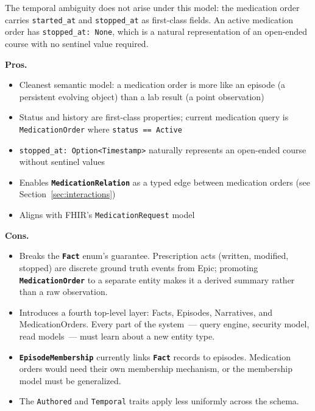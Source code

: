 \documentclass[11pt]{article}
\newcommand{\entity}[1]{\texttt{\textbf{#1}}}
\newcommand{\field}[1]{\texttt{#1}}
\newenvironment{prosbox}{%
  \begin{mdframed}[backgroundcolor=notegreen,
    linecolor=noteborder, linewidth=1pt,
    innertopmargin=8pt, innerbottommargin=8pt,
    innerleftmargin=10pt, innerrightmargin=10pt]
  \small
}{%
  \end{mdframed}
}
\newenvironment{consbox}{%
  \begin{mdframed}[backgroundcolor=warningyellow,
    linecolor=warningborder, linewidth=1pt,
    innertopmargin=8pt, innerbottommargin=8pt,
    innerleftmargin=10pt, innerrightmargin=10pt]
  \small
}{%
  \end{mdframed}
}
\begin{document}
The temporal ambiguity does not arise under this model: the medication
order carries \field{started\_at} and \field{stopped\_at} as
first-class fields. An active medication order has
\field{stopped\_at: None}, which is a natural representation of an
open-ended course with no sentinel value required.

\begin{prosbox}
\textbf{Pros.}
\begin{itemize}[noitemsep]
  \item Cleanest semantic model: a medication order is more like an
    episode (a persistent evolving object) than a lab result (a point
    observation)
  \item Status and history are first-class properties; current
    medication query is \field{MedicationOrder} where
    \field{status == Active}
  \item \field{stopped\_at: Option<Timestamp>} naturally represents
    an open-ended course without sentinel values
  \item Enables \entity{MedicationRelation} as a typed edge between
    medication orders (see Section~\ref{sec:interactions})
  \item Aligns with FHIR's \texttt{MedicationRequest} model
\end{itemize}
\end{prosbox}

\begin{consbox}
\textbf{Cons.}
\begin{itemize}[noitemsep]
  \item Breaks the \entity{Fact} enum's guarantee. Prescription acts
    (written, modified, stopped) are discrete ground truth events from
    Epic; promoting \entity{MedicationOrder} to a separate entity
    makes it a derived summary rather than a raw observation.
  \item Introduces a fourth top-level layer: Facts, Episodes,
    Narratives, and MedicationOrders. Every part of the system~---
    query engine, security model, read models~--- must learn about a
    new entity type.
  \item \entity{EpisodeMembership} currently links \entity{Fact}
    records to episodes. Medication orders would need their own
    membership mechanism, or the membership model must be generalized.
  \item The \field{Authored} and \field{Temporal} traits apply less
    uniformly across the schema.
\end{itemize}
\end{consbox}
\end{document}
